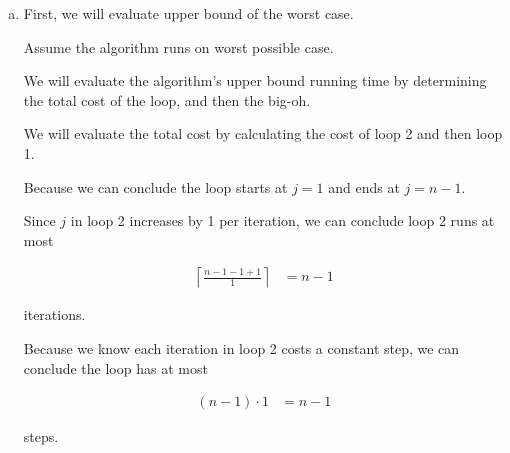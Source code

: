 \documentclass[12pt]{article}
\begin{document}
\begin{enumerate}[a.]
    \item

    First, we will evaluate upper bound of the worst case.

    \bigskip

    Assume the algorithm runs on worst possible case.

    \bigskip

    We will evaluate the algorithm's upper bound running time by determining
    the total cost of the loop, and then the big-oh.

    \bigskip

    We will evaluate the total cost by calculating the cost of loop 2 and then loop 1.

    \bigskip

    Because we can conclude the loop starts at $j = 1$ and ends
    at $j = n-1$.

    \bigskip

    Since $j$ in loop 2 increases by 1 per iteration, we can conclude loop 2
    runs at most

    \setcounter{equation}{0}
    \begin{align}
        \left\lceil \frac{n-1-1+1}{1} \right\rceil &= n - 1
    \end{align}

    iterations.

    \bigskip

    Because we know each iteration in loop 2 costs a constant step, we can
    conclude the loop has at most

    \begin{align}
        (n - 1) \cdot 1 &= n - 1
    \end{align}

    steps.

\end{enumerate}
\end{document}
